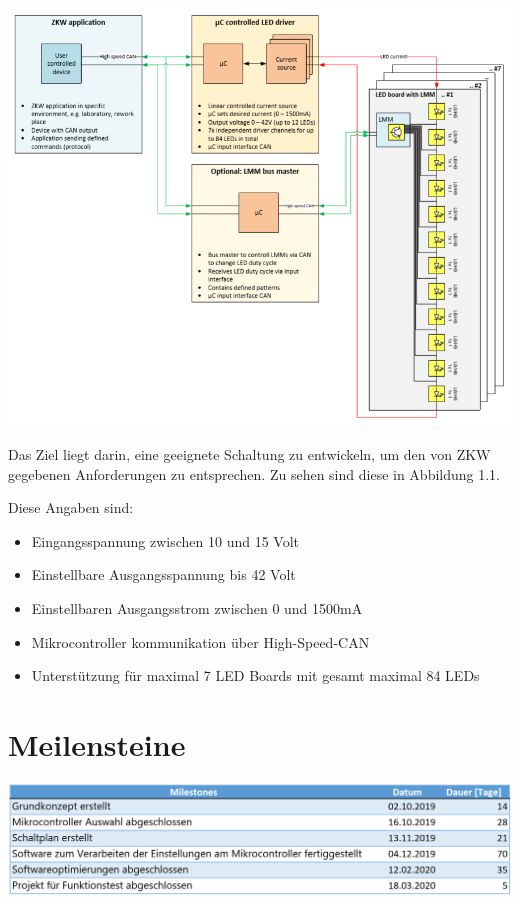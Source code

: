 \documentclass[paper=a4, 12pt]{scrreprt}
\begin{document}
	\begin{adjustbox}{center,caption={Blockschaltbild von ZKW},label={ZKW-Blockschaltbild},nofloat=figure,vspace=\bigskipamount}
	\includegraphics[width=15cm]{img/ZKW_Blockschaltbild.PNG}
	\end{adjustbox}

	Das Ziel liegt darin, eine geeignete Schaltung zu entwickeln, um den von ZKW gegebenen Anforderungen zu entsprechen. Zu sehen sind diese in Abbildung 1.1.
	
	Diese Angaben sind:
	\begin{itemize}
		\item{Eingangsspannung zwischen 10 und 15 Volt}
		\item{Einstellbare Ausgangsspannung bis 42 Volt}
		\item{Einstellbaren Ausgangsstrom zwischen 0 und 1500mA}
		\item{Mikrocontroller kommunikation über High-Speed-CAN}
		\item{Unterstützung für maximal 7 LED Boards mit gesamt maximal 84 LEDs}
	\end{itemize}
	
	\section{Meilensteine}\hfill \break
	\begin{adjustbox}{center,nofloat=figure,vspace=\bigskipamount}
	\includegraphics[width=\textwidth]{img/meilensteine.PNG}
	\end{adjustbox}
	
\end{document}
